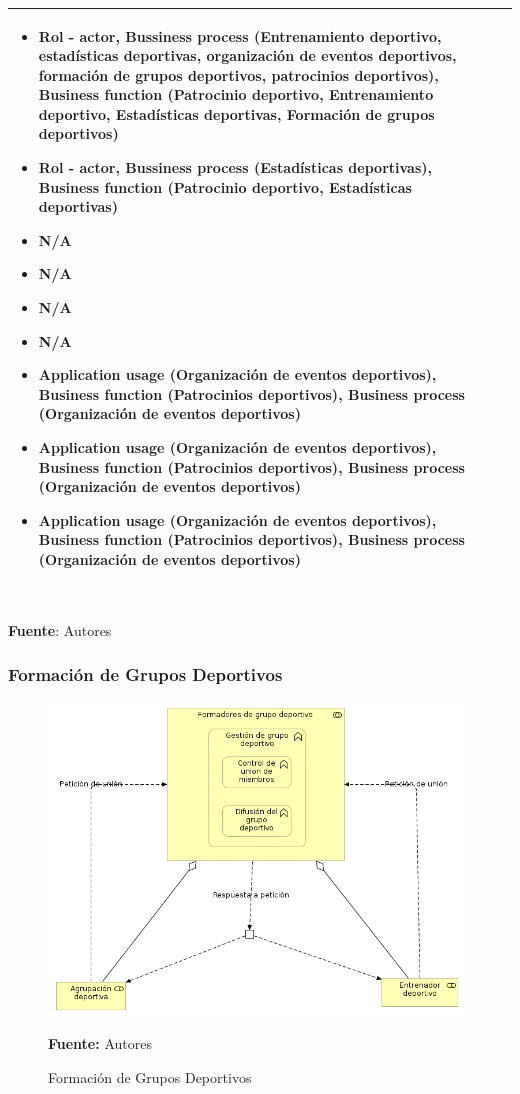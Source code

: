 \begin{table}[!htb]
\begin{center}
{\begin{tabular}{|p{7cm}|p{4cm}|}
\begin{itemize}
				\item Rol - actor, Bussiness process (Entrenamiento deportivo, estadísticas deportivas, organización de eventos deportivos, formación de grupos deportivos, patrocinios deportivos), Business function (Patrocinio deportivo, Entrenamiento deportivo, Estadísticas deportivas, Formación de grupos deportivos)
				\item Rol - actor, Bussiness process (Estadísticas deportivas), Business function (Patrocinio deportivo, Estadísticas deportivas)
				\item N/A
				\item N/A
				\item N/A
				\item N/A
				\item Application usage (Organización de eventos deportivos), Business function (Patrocinios deportivos), Business process (Organización de eventos deportivos)
				\item Application usage (Organización de eventos deportivos), Business function (Patrocinios deportivos), Business process (Organización de eventos deportivos)
				\item Application usage (Organización de eventos deportivos), Business function (Patrocinios deportivos), Business process (Organización de eventos deportivos)
			\end{itemize} 
			\\
			\hline
		\end{tabular}
		} \\
		\textbf{Fuente}: Autores
	\end{center}
\end{table}

\subsubsection{Formación de Grupos Deportivos}

\begin{figure}[!htb]
  \begin{center}
    \includegraphics[width=11cm]{./imagenes/business_functions/formaciongruposdeportivos.png}
    \caption{Formación de Grupos Deportivos}
    \label{fig:bf_formacion_grupos_deportivos}
    \textbf{Fuente:}  Autores
  \end{center}
\end{figure}

